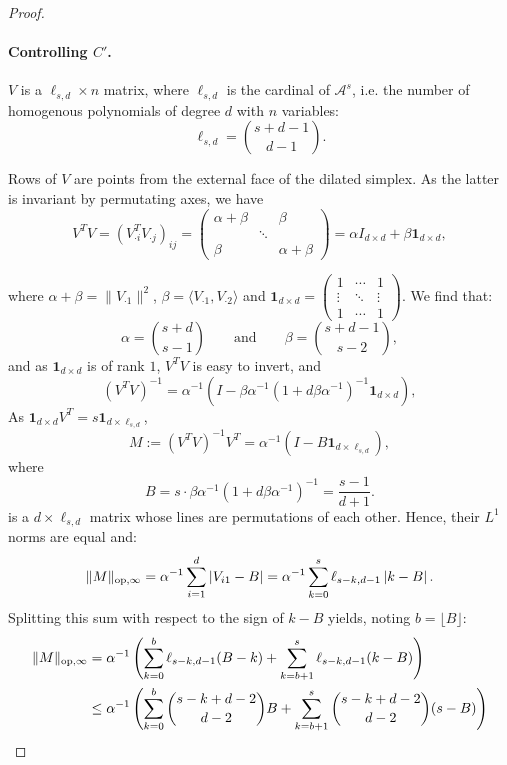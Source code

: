 \documentclass[oneside,english,a4paper]{amsart}
\numberwithin{equation}{section}
\numberwithin{figure}{section}
\theoremstyle{plain}
\theoremstyle{definition}
\theoremstyle{plain}
\theoremstyle{remark}
\theoremstyle{plain}
\theoremstyle{definition}
\theoremstyle{definition}
\begin{document}
\begin{proof}
\paragraph{Controlling $C'$.}

$V$ is a $\ell_{s,d}\times n$ matrix, where $\ell_{s,d}$ is the
cardinal of $\mathcal{A}^{s}$, i.e. the number of homogenous polynomials
of degree $d$ with $n$ variables:
\[
\ell_{s,d}=\binom{s+d-1}{d-1}.
\]

Rows of $V$ are points from the external face of the dilated simplex.
As the latter is invariant by permutating axes, we have
\[
V^{T}V=(V_{\cdot i}^{T}V_{\cdot j})_{ij}=\begin{pmatrix}\alpha+\beta &  & \beta\\
 & \ddots\\
\beta &  & \alpha+\beta
\end{pmatrix}=\alpha I_{d\times d}+\beta\mathbf{1}_{d\times d},
\]

where $\alpha+\beta=\lVert V_{\cdot1}\rVert^{2}$, $\beta=\langle V_{\cdot1},V_{\cdot2}\rangle$
and $\mathbf{1}_{d\times d}=\begin{pmatrix}1 & \cdots & 1\\
\vdots & \ddots & \vdots\\
1 & \cdots & 1
\end{pmatrix}$. We find that:
\[
\alpha=\binom{s+d}{s-1}\qquad\text{and}\qquad\beta=\binom{s+d-1}{s-2},
\]
and as $\mathbf{1}_{d\times d}$ is of rank $1$, $V^{T}V$ is easy
to invert, and
\[
(V^{T}V)^{-1}=\alpha^{-1}\left(I-\beta\alpha^{-1}(1+d\beta\alpha^{-1})^{-1}\mathbf{1}_{d\times d}\right),
\]
As $\mathbf{1}_{d\times d}V^{T}=s\mathbf{1}_{d\times\ell_{s,d}}$,
\[
M:=(V^{T}V)^{-1}V^{T}=\alpha^{-1}\left(I-B\mathbf{1}_{d\times\ell_{s,d}}\right),
\]
where
\[
B=s\cdot\beta\alpha^{-1}(1+d\beta\alpha^{-1})^{-1}=\frac{s-1}{d+1}.
\]
is a $d\times\ell_{s,d}$ matrix whose lines are permutations of each
other. Hence, their $L^{1}$ norms are equal and:
\[
\lVert M\rVert_{\text{op,\ensuremath{\infty}}}=\alpha^{-1}\sum_{i=1}^{d}\left|V_{i1}-B\right|=\alpha^{-1}\sum_{k=0}^{s}\ell_{s-k,d-1}\left|k-B\right|.
\]
Splitting this sum with respect to the sign of $k-B$ yields, noting
$b=\lfloor B\rfloor$:
\begin{align*}
\lVert M\rVert_{\text{op,\ensuremath{\infty}}} & =\alpha^{-1}\left(\sum_{k=0}^{b}\ell_{s-k,d-1}(B-k)+\sum_{k=b+1}^{s}\ell_{s-k,d-1}(k-B)\right)\\
 & \le\alpha^{-1}\left(\sum_{k=0}^{b}\binom{s-k+d-2}{d-2}B+\sum_{k=b+1}^{s}\binom{s-k+d-2}{d-2}(s-B)\right)
\end{align*}


\end{proof}
\end{document}
